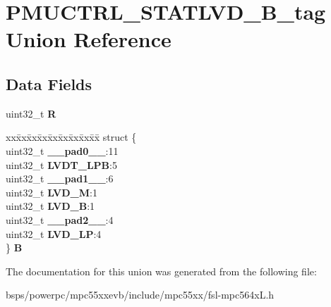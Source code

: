 \hypertarget{unionPMUCTRL__STATLVD__32B__tag}{}\section{P\+M\+U\+C\+T\+R\+L\+\_\+\+S\+T\+A\+T\+L\+V\+D\+\_\+B\+\_\+tag Union Reference}
\label{unionPMUCTRL__STATLVD__32B__tag}
\subsection*{Data Fields}
\begin{DoxyCompactItemize}
\item 
\mbox{\label{unionPMUCTRL__STATLVD__32B__tag_a7e4446ad4d4a38688f9251feb2ca4690}} 
uint32\+\_\+t {\bfseries R}
\item 
\mbox{\label{unionPMUCTRL__STATLVD__32B__tag_ac1392129d97c497c17184b0e38380321}} 
\begin{tabbing}
xx\=xx\=xx\=xx\=xx\=xx\=xx\=xx\=xx\=\kill
struct \{\\
\>uint32\_t {\bfseries \_\_pad0\_\_}:11\\
\>uint32\_t {\bfseries LVDT\_LPB}:5\\
\>uint32\_t {\bfseries \_\_pad1\_\_}:6\\
\>uint32\_t {\bfseries LVD\_M}:1\\
\>uint32\_t {\bfseries LVD\_B}:1\\
\>uint32\_t {\bfseries \_\_pad2\_\_}:4\\
\>uint32\_t {\bfseries LVD\_LP}:4\\
\} {\bfseries B}\\

\end{tabbing}\end{DoxyCompactItemize}


The documentation for this union was generated from the following file\+:\begin{DoxyCompactItemize}
\item 
bsps/powerpc/mpc55xxevb/include/mpc55xx/fsl-\/mpc564x\+L.\+h\end{DoxyCompactItemize}
